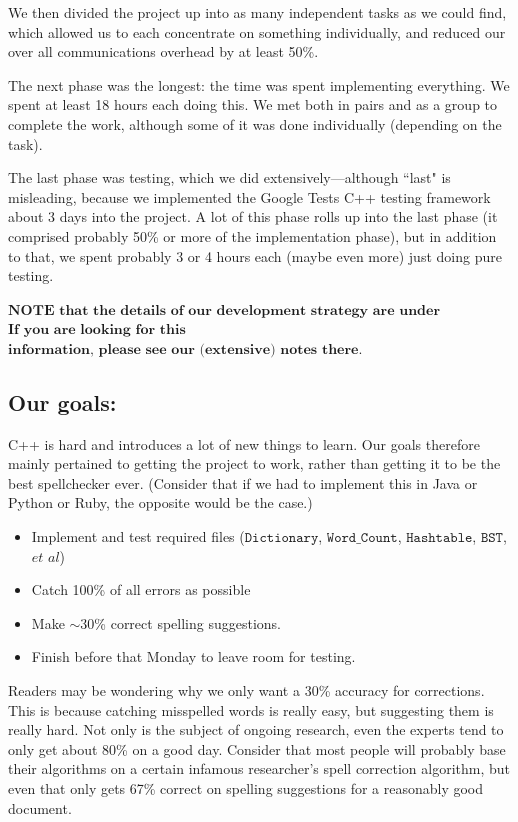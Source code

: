 \documentclass[a4paper]{article}
\begin{document}
We then divided the project up into as many independent tasks as we could find, which allowed us to each concentrate on something individually, and reduced our over all communications overhead by at least 50\%.

The next phase was the longest: the time was spent implementing everything. We spent at least 18 hours each doing this. We met both in pairs and as a group to complete the work, although some of it was done individually (depending on the task).

The last phase was testing, which we did extensively---although ``last" is misleading, because we implemented the Google Tests C++ testing framework about 3 days into the project. A lot of this phase rolls up into the last phase (it comprised probably 50\% or more of the implementation phase), but in addition to that, we spent probably 3 or 4 hours each (maybe even more) just doing pure testing.

$\textbf{NOTE that the details of our development strategy are under ``Reflections".}$ $\textbf{If you are}$ $\textbf{looking}$ $\textbf{for this}$ $\textbf{information, please see our (extensive) notes there.}$

\subsection*{Our goals:}

C++ is hard and introduces a lot of new things to learn. Our goals therefore mainly pertained to getting the project to work, rather than getting it to be the best spellchecker ever. (Consider that if we had to implement this in Java or Python or Ruby, the opposite would be the case.)

\begin{itemize}
	\item Implement and test required files ($\texttt{Dictionary}$, $\texttt{Word\_Count}$, $\texttt{Hashtable}$, $\texttt{BST}$, $\textit{et al}$)
	\item Catch 100\% of all errors as possible
	\item Make $\sim$30\% correct spelling suggestions.
	\item Finish before that Monday to leave room for testing.
\end{itemize}

Readers may be wondering why we only want a 30\% accuracy for corrections. This is because catching misspelled words is really easy, but suggesting them is really hard. Not only is the subject of ongoing research, even the experts tend to only get about 80\% on a good day. Consider that most people will probably base their algorithms on a certain infamous researcher's spell correction algorithm, but even that only gets 67\% correct on spelling suggestions for a reasonably good document.
\end{document}

